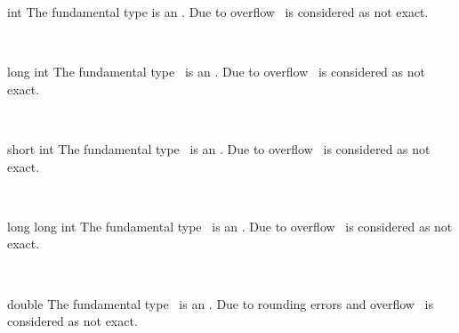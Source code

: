 \ccDefGlobalScope{}

\begin{ccRefClass}{int}
\ccDefinition
The fundamental type  is an  . 
Due to overflow \ccRefName\ is considered as not exact. 

\ccIsModel
{}\\
\end{ccRefClass}


\begin{ccRefClass}{long int}
\ccDefinition
The fundamental type \ccRefName\ is an  
. Due to overflow \ccRefName\ is considered as not exact. 

\ccIsModel
{}\\
\end{ccRefClass}


\begin{ccRefClass}{short int}
\ccDefinition
The fundamental type \ccRefName\ is an  
. Due to overflow \ccRefName\ is considered as not exact.
 
\ccIsModel
{}\\
\end{ccRefClass}


\begin{ccRefClass}{long long int}
\ccDefinition
The fundamental type \ccRefName\ is an  
. Due to overflow \ccRefName\ is considered as not exact.
 
\ccIsModel
{}\\
\end{ccRefClass}


\begin{ccRefClass}{double}
\ccDefinition
The fundamental type \ccRefName\ is an  
. Due to rounding errors and overflow \ccRefName\ is 
considered as not exact.
 
\ccIsModel
{}\\
\end{ccRefClass}

